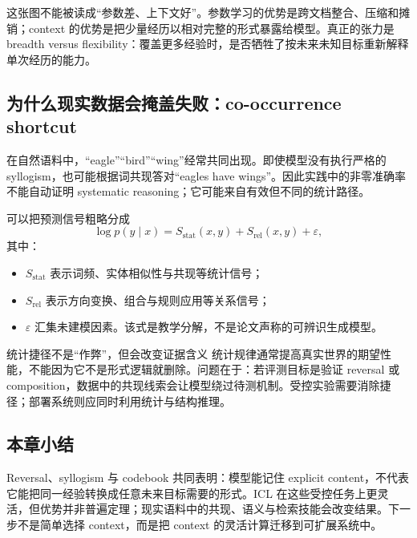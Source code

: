 
这张图不能被读成“参数差、上下文好”。参数学习的优势是跨文档整合、压缩和摊销；context 的优势是把少量经历以相对完整的形式暴露给模型。真正的张力是 breadth versus flexibility：覆盖更多经验时，是否牺牲了按未来未知目标重新解释单次经历的能力。

\subsection{为什么现实数据会掩盖失败：co-occurrence shortcut}

在自然语料中，“eagle”“bird”“wing”经常共同出现。即使模型没有执行严格的 syllogism，也可能根据词共现答对“eagles have wings”。因此实践中的非零准确率不能自动证明 systematic reasoning；它可能来自有效但不同的统计路径。


可以把预测信号粗略分成
$$
\log p(y\mid x)=S_{\text{stat}}(x,y)+S_{\text{rel}}(x,y)+\varepsilon,
$$
其中：
\begin{itemize}
  \item $S_{\text{stat}}$ 表示词频、实体相似性与共现等统计信号；
  \item $S_{\text{rel}}$ 表示方向变换、组合与规则应用等关系信号；
  \item $\varepsilon$ 汇集未建模因素。该式是教学分解，不是论文声称的可辨识生成模型。
\end{itemize}

\begin{warningbox}{统计捷径不是“作弊”，但会改变证据含义}
统计规律通常提高真实世界的期望性能，不能因为它不是形式逻辑就删除。问题在于：若评测目标是验证 reversal 或 composition，数据中的共现线索会让模型绕过待测机制。受控实验需要消除捷径；部署系统则应同时利用统计与结构推理。
\end{warningbox}



\subsection{本章小结}

Reversal、syllogism 与 codebook 共同表明：模型能记住 explicit content，不代表它能把同一经验转换成任意未来目标需要的形式。ICL 在这些受控任务上更灵活，但优势并非普遍定理；现实语料中的共现、语义与检索技能会改变结果。下一步不是简单选择 context，而是把 context 的灵活计算迁移到可扩展系统中。

